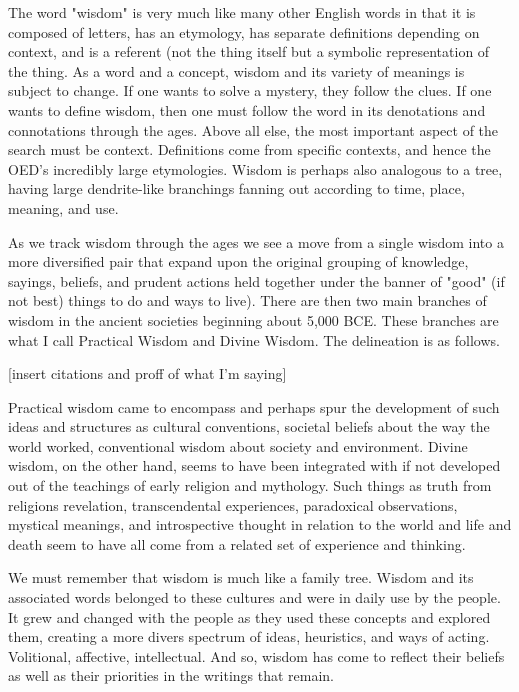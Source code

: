 The word "wisdom" is very much like many other English words in that it is composed of letters, has an etymology,   has separate definitions depending on context, and is a referent (not the thing itself but a symbolic representation of the thing. As a word and a concept, wisdom and its variety of meanings is subject to change. If one wants to solve a mystery, they follow the clues. If one wants to define wisdom, then one must follow the word in its denotations and connotations through the ages. Above all else, the most important aspect of the search must be context. Definitions come from specific contexts, and hence the OED's incredibly large etymologies. Wisdom is perhaps also analogous to a tree, having large dendrite-like branchings fanning out according to time, place, meaning, and use.

As we track wisdom through the ages we see a move from a single wisdom into a more diversified pair that expand upon the original grouping of knowledge, sayings, beliefs, and prudent actions held together under the banner of "good" (if not best) things to do and ways to live). There are then two main branches of wisdom in the ancient societies beginning about 5,000 BCE. These branches are what I call Practical Wisdom and Divine Wisdom. The delineation is as follows.
 
[insert citations and proff of what I'm saying]
 
Practical wisdom came to encompass and perhaps spur the development of such ideas and structures as cultural conventions, societal beliefs about the way the world worked, conventional wisdom about society and environment. Divine wisdom, on the other hand, seems to have been integrated with if not developed out of the teachings of early religion and mythology. Such things as truth from religions revelation, transcendental experiences, paradoxical observations, mystical meanings, and introspective thought in relation to the world and life and death seem to have all come from a related set of experience and thinking.

We must remember that wisdom is much like a family tree. Wisdom and its associated words belonged to these cultures and were in daily use by the people. It grew and changed with the people as they used these concepts and explored them, creating a more divers spectrum of ideas, heuristics, and ways of acting. Volitional, affective, intellectual. And so, wisdom has come to reflect their beliefs as well as their priorities in the writings that remain.
 

